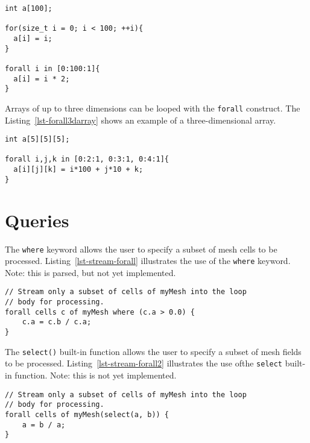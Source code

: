 \par\bigskip
\begin{lstlisting}[float=h,label=lst-forall1darray,
	caption={\texttt{forall} loop construct for one-dimensional array.}]
int a[100];

for(size_t i = 0; i < 100; ++i){
  a[i] = i;
}  

forall i in [0:100:1]{
  a[i] = i * 2;
}
\end{lstlisting}
\par\bigskip\noindent

Arrays of up to three dimensions can be looped with the \texttt{forall} construct.
The Listing~\ref{lst-forall3darray} shows an example of a three-dimensional array.

\par\bigskip
\begin{lstlisting}[float=h,label=lst-forall3darray,
	caption={\texttt{forall} loop construct for three-dimensional array.}]
int a[5][5][5];

forall i,j,k in [0:2:1, 0:3:1, 0:4:1]{
  a[i][j][k] = i*100 + j*10 + k;
}
\end{lstlisting}
\par\bigskip\noindent


\section{Queries}

The \texttt{where} keyword allows the user to specify a subset of mesh cells 
to be processed.  Listing~\ref{lst-stream-forall} illustrates the use of
the \texttt{where} keyword.  Note: this is parsed, but not yet implemented.

\par\bigskip
\begin{lstlisting}[float=h,label=lst-stream-forall,
	caption={Streaming \texttt{forall} loop construct using \texttt{where}.}]
// Stream only a subset of cells of myMesh into the loop
// body for processing. 
forall cells c of myMesh where (c.a > 0.0) { 
	c.a = c.b / c.a;
}
\end{lstlisting}
\par\bigskip\noindent

The \texttt{select()} built-in function allows the user to specify a subset of mesh fields
to be processed.  Listing~\ref{lst-stream-forall2} illustrates the use ofthe \texttt{select} 
built-in function.  Note: this is not yet implemented.

\par\bigskip
\begin{lstlisting}[float=h,label=lst-stream-forall2,
	caption={Streaming \texttt{forall} loop construct using \texttt{select}.}]
// Stream only a subset of cells of myMesh into the loop
// body for processing. 
forall cells of myMesh(select(a, b)) { 
	a = b / a;
}
\end{lstlisting}
\par\bigskip\noindent

